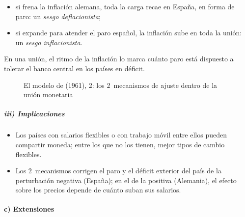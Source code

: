 \documentclass[11pt]{article}
\begin{document}
\begin{itemize}
{\begin{itemize}
\item si frena la inflación alemana, toda la carga recae en España, en forma de paro: un \emph{sesgo deflacionista};
\item si expande para atender el paro español, la inflación sube en toda la unión: un \emph{sesgo inflacionista}.
\end{itemize}
En una unión, el ritmo de la inflación lo marca cuánto paro está dispuesto a tolerar el banco central en los países en déficit\nocite{SanchisiMarco2014Economics}.}
\end{itemize}

\begin{figure}[H]
\centering
\caption{El modelo de  (1961), 2: los 2~mecanismos de ajuste dentro de la unión monetaria}\label{fig:mundell}
\end{figure}

\subparagraph{iii) Implicaciones}

\begin{itemize}
\item Los países con salarios flexibles o con trabajo móvil entre ellos pueden compartir moneda; entre los que no los tienen, mejor tipos de cambio flexibles.
\item Los 2~mecanismos corrigen el paro y el déficit exterior del país de la perturbación negativa (España); en el de la positiva (Alemania), el efecto sobre los precios depende de cuánto suban sus salarios.
\end{itemize}

\paragraph{c) Extensiones}
\end{document}
